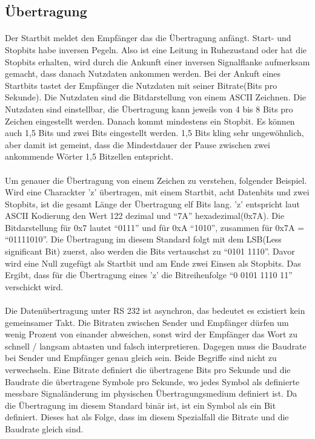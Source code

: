 \subsection{Übertragung}
\paragraph{}
Der Startbit meldet den Empfänger das die Übertragung anfängt. Start- und Stopbits habe inversen Pegeln. Also ist eine Leitung in Ruhezustand oder hat die Stopbits erhalten, wird durch die Ankunft einer inversen Signalflanke aufmerksam gemacht, dass danach Nutzdaten ankommen werden. Bei der Ankuft eines Startbits tastet der Empfänger die Nutzdaten mit seiner Bitrate(Bits pro Sekunde).  Die Nutzdaten sind die Bitdarstellung von einem ASCII Zeichnen. Die Nutzdaten sind einstellbar, die Übertragung kann jeweils von 4 bis 8 Bits pro Zeichen eingestellt werden. Danach kommt mindestens ein Stopbit. Es können auch 1,5 Bits und zwei Bits eingestellt werden. 1,5 Bits kling sehr ungewöhnlich, aber damit ist gemeint, dass die Mindestdauer der Pause zwischen zwei ankommende Wörter 1,5 Bitzellen entspricht. 

\paragraph{}
Um genauer die Übertragung von einem Zeichen zu verstehen, folgender Beispiel. Wird eine Charackter 'z' übertragen, mit einem Startbit, acht Datenbits und zwei Stopbits, ist die gesamt Länge der Übertragung elf Bits lang. 'z' entspricht laut ASCII Kodierung den Wert 122 dezimal und "`7A"' hexadezimal(0x7A). Die Bitdarstellung für 0x7 lautet "`0111"' und für 0xA "`1010"', zusammen für 0x7A = "`01111010"'. Die Übertragung im diesem Standard folgt mit dem LSB(Less significant Bit) zuerst, also werden die Bits vertauschst zu "`0101 1110"'. Davor wird eine Null zugefügt als Startbit und am Ende zwei Einsen als Stopbits. Das Ergibt, dass für die Übertragung eines 'z' die Bitreihenfolge "`0 0101 1110 11"' verschickt wird.

\paragraph{}
Die Datenübertragung unter RS 232 ist asynchron, das bedeutet es existiert kein gemeinsamer Takt. Die Bitraten zwischen Sender und Empfänger dürfen um wenig Prozent von einander abweichen, sonst wird der Empfänger das Wort zu schnell / langsam abtasten und falsch interpretieren. Dagegen muss die Baudrate bei Sender und Empfänger genau gleich sein. Beide Begriffe sind nicht zu verwechseln. Eine Bitrate definiert die übertragene Bits pro Sekunde und die Baudrate die übertragene Symbole pro Sekunde, wo jedes Symbol als definierte messbare Signaländerung im physischen Übertragungsmedium definiert ist. Da die Übertragung im diesem Standard binär ist, ist ein Symbol als ein Bit definiert. Dieses hat als Folge, dass im diesem Spezialfall die Bitrate und die Baudrate gleich sind.

